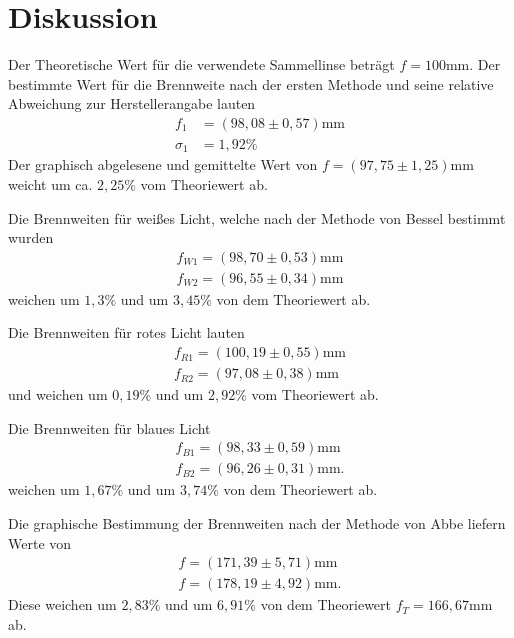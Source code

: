 \section{Diskussion}
\label{sec:Diskussion}

Der Theoretische Wert für die verwendete Sammellinse beträgt $f=100\si{\milli\meter}$.
Der bestimmte Wert für die Brennweite nach der ersten Methode und seine relative Abweichung zur Herstellerangabe lauten
\begin{align*}
f_1 &= (98,08 \pm 0,57) \si{\milli\meter}\\
\sigma_1 &= 1,92 \%
\end{align*}
\noindent Der graphisch abgelesene und gemittelte Wert von $f = (97,75 \pm 1,25)\si{\milli\meter}$ weicht um ca. $2,25 \%$ vom Theoriewert ab.


\noindent Die Brennweiten für weißes Licht, welche nach der Methode von Bessel bestimmt wurden 
\begin{align*}
f_{W1} = (98,70 \pm 0,53) \si{\milli\meter} \\
f_{W2} = (96,55 \pm 0,34) \si{\milli\meter} 
\end{align*}
weichen um $1,3 \%$ und um $3,45 \%$ von dem Theoriewert ab. 

\noindent Die Brennweiten für rotes Licht lauten
\begin{align*}
f_{R1} = (100,19 \pm 0,55) \si{\milli\meter} \\
f_{R2} = (97,08 \pm 0,38) \si{\milli\meter} 
\end{align*}
und weichen um $0,19 \%$ und um $2,92 \%$ vom Theoriewert ab.

\noindent Die Brennweiten für blaues Licht
\begin{align*}
f_{B1} = (98,33 \pm 0,59) \si{\milli\meter} \\
f_{B2} = (96,26 \pm 0,31) \si{\milli\meter} .
\end{align*}
weichen um $1,67 \%$ und um $3,74 \%$ von dem Theoriewert ab.

\noindent Die graphische Bestimmung der Brennweiten nach der Methode von Abbe liefern Werte von 
\begin{align*}
f = (171,39 \pm 5,71)\si{\milli\meter} \\
f = (178,19 \pm 4,92)\si{\milli\meter}.
\end{align*}
Diese weichen um $2,83 \%$ und um $6,91 \%$ von dem Theoriewert $f_T = 166,67 \si{\milli\meter}$ ab.

